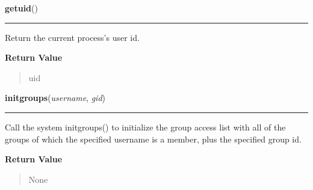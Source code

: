 \hspace{.8\funcindent}\begin{boxedminipage}{\funcwidth}

    \raggedright \textbf{getuid}()

    \vspace{-1.5ex}

    \rule{\textwidth}{0.5\fboxrule}
\setlength{\parskip}{2ex}
    Return the current process's user id.

\setlength{\parskip}{1ex}
      \textbf{Return Value}
    \vspace{-1ex}

      \begin{quote}
      uid

      \end{quote}

    \end{boxedminipage}

    \label{os:initgroups}

    \vspace{0.5ex}

\hspace{.8\funcindent}\begin{boxedminipage}{\funcwidth}

    \raggedright \textbf{initgroups}(\textit{username}, \textit{gid})

    \vspace{-1.5ex}

    \rule{\textwidth}{0.5\fboxrule}
\setlength{\parskip}{2ex}
    Call the system initgroups() to initialize the group access list with 
    all of the groups of which the specified username is a member, plus the
    specified group id.

\setlength{\parskip}{1ex}
      \textbf{Return Value}
    \vspace{-1ex}

      \begin{quote}
      None

      \end{quote}

    \end{boxedminipage}

    \label{os:isatty}

    \vspace{0.5ex}

